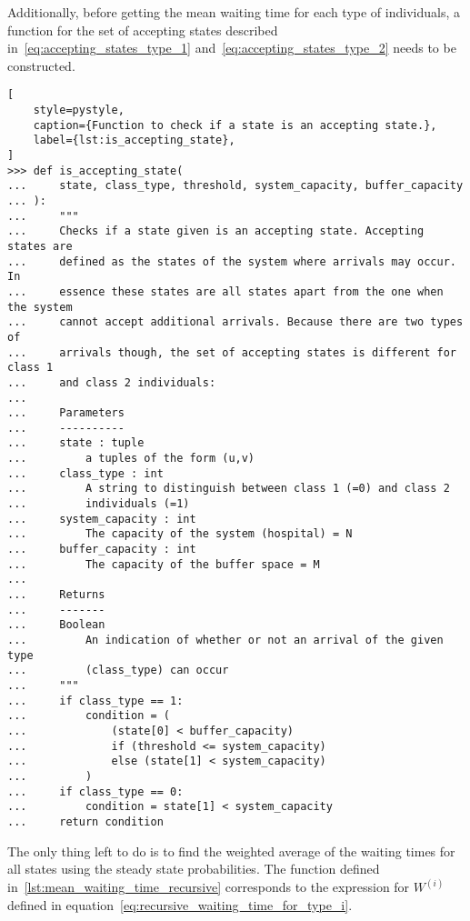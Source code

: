 Additionally, before getting the mean waiting time for each type of individuals,
a function for the set of accepting states described
in~\eqref{eq:accepting_states_type_1} and~\eqref{eq:accepting_states_type_2}
needs to be constructed.

\begin{lstlisting}[
    style=pystyle,
    caption={Function to check if a state is an accepting state.},
    label={lst:is_accepting_state},
]
>>> def is_accepting_state(
...     state, class_type, threshold, system_capacity, buffer_capacity
... ):
...     """
...     Checks if a state given is an accepting state. Accepting states are
...     defined as the states of the system where arrivals may occur. In
...     essence these states are all states apart from the one when the system
...     cannot accept additional arrivals. Because there are two types of
...     arrivals though, the set of accepting states is different for class 1
...     and class 2 individuals:
... 
...     Parameters
...     ----------
...     state : tuple
...         a tuples of the form (u,v)
...     class_type : int
...         A string to distinguish between class 1 (=0) and class 2
...         individuals (=1)
...     system_capacity : int
...         The capacity of the system (hospital) = N
...     buffer_capacity : int
...         The capacity of the buffer space = M
... 
...     Returns
...     -------
...     Boolean
...         An indication of whether or not an arrival of the given type
...         (class_type) can occur
...     """
...     if class_type == 1:
...         condition = (
...             (state[0] < buffer_capacity)
...             if (threshold <= system_capacity)
...             else (state[1] < system_capacity)
...         )
...     if class_type == 0:
...         condition = state[1] < system_capacity
...     return condition

\end{lstlisting}

The only thing left to do is to find the weighted average of the waiting times
for all states using the steady state probabilities.
The function defined in~\ref{lst:mean_waiting_time_recursive}
corresponds to the expression for \(W^{(i)}\)
defined in equation~\eqref{eq:recursive_waiting_time_for_type_i}.

